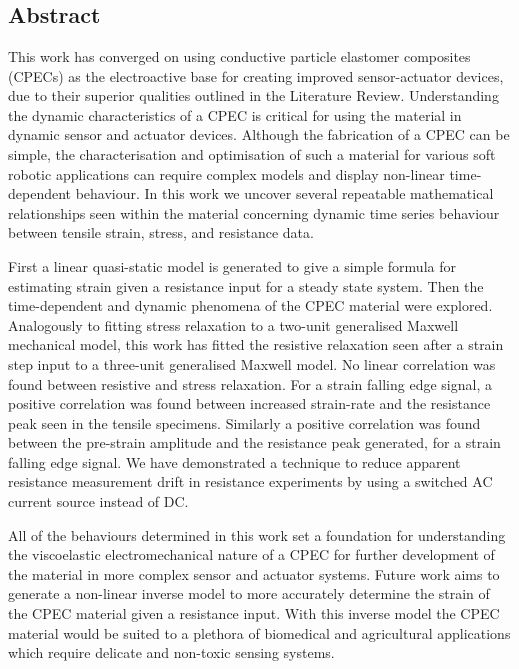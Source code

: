 \chapter{\chapiiiname}
\label{chapter3}

\section*{Abstract}
This work has converged on using conductive particle elastomer composites (CPECs) as the electroactive base for creating improved sensor-actuator devices, due to their superior qualities outlined in the Literature Review. Understanding the dynamic characteristics of a CPEC is critical for using the material in dynamic sensor and actuator devices. Although the fabrication of a CPEC can be simple, the characterisation and optimisation of such a material for various soft robotic applications can require complex models and display non-linear time-dependent behaviour. In this work we uncover several repeatable mathematical relationships seen within the material concerning dynamic time series behaviour between tensile strain, stress, and resistance data. 

First a linear quasi-static model is generated to give a simple formula for estimating strain given a resistance input for a steady state system. Then the time-dependent and dynamic phenomena of the CPEC material were explored. Analogously to fitting stress relaxation to a two-unit generalised Maxwell mechanical model, this work has fitted the resistive relaxation seen after a strain step input to a three-unit generalised Maxwell model. No linear correlation was found between resistive and stress relaxation. For a strain falling edge signal, a positive correlation was found between increased strain-rate and the resistance peak seen in the tensile specimens. Similarly a positive correlation was found between the pre-strain amplitude and the resistance peak generated, for a strain falling edge signal. We have demonstrated a technique to reduce apparent resistance measurement drift in resistance experiments by using a switched AC current source instead of DC.

All of the behaviours determined in this work set a foundation for understanding the viscoelastic electromechanical nature of a CPEC for further development of the material in more complex sensor and actuator systems. Future work aims to generate a non-linear inverse model to more accurately determine the strain of the CPEC material given a resistance input. With this inverse model the CPEC material would be suited to a plethora of biomedical and agricultural applications which require delicate and non-toxic sensing systems.



